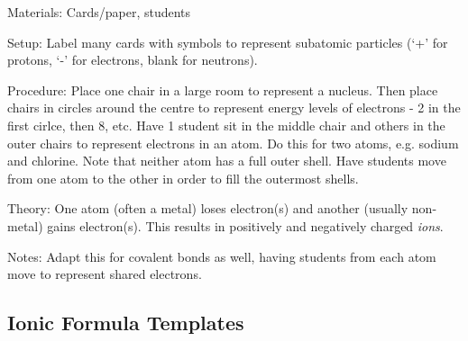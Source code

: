 \begin{multicols}{2}
\begin{description*}
\item[Materials:]{Cards/paper, students}
\item[Setup:]{Label many cards with symbols to represent subatomic particles (`+' for protons, `-' for electrons, blank for neutrons).}
\item[Procedure:]{Place one chair in a large room to represent a nucleus. Then place chairs in circles around the centre to represent energy levels of electrons - 2 in the first cirlce, then 8, etc. Have 1 student sit in the middle chair and others in the outer chairs to represent electrons in an atom. Do this for two atoms, e.g. sodium and chlorine. Note that neither atom has a full outer shell. Have students move from one atom to the other in order to fill the outermost shells. }
\item[Theory:]{One atom (often a metal) loses electron(s) and another (usually non-metal) gains electron(s). This results in positively and negatively charged \emph{ions}.}
\item[Notes:]{Adapt this for covalent bonds as well, having students from each atom move to represent shared electrons.}
\end{description*}

\columnbreak

\subsection{Ionic Formula Templates}


\end{multicols}
